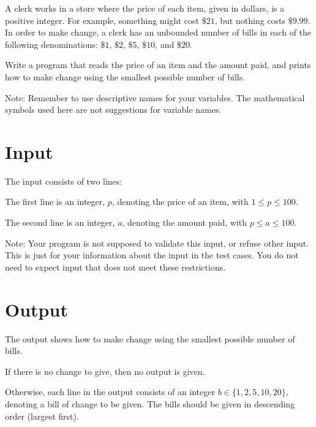 
\noindent
A clerk works in a store where the price of each item, given in dollars, is a positive integer.
For example, something might cost $\$21$, but nothing costs $\$9.99$. 
In order to make change, a clerk has an unbounded number of bills in each of the following denominations:
$\$1$, $\$2$, $\$5$, $\$10$, and $\$20$.

Write a program that reads the price of an item and the amount paid,
and prints how to make change using the smallest possible number of bills.

Note: Remember to use descriptive names for your variables.
The mathematical symbols used here are not suggestions for variable names.

\section*{Input}
The input consists of two lines:

The first line is an integer, $p$, denoting the price of an item, with $1 \leq p \leq 100$.

The second line is an integer, $a$, denoting the amount paid, with $p \leq a \leq 100$.

Note: Your program is not supposed to validate this input, or refuse other input.
This is just for your information about the input in the test cases.
You do not need to expect input that does not meet these restrictions.

\section*{Output}
The output shows how to make change using the smallest possible number of bills.

If there is no change to give, then no output is given.

Otherwise, each line in the output consists of an integer
$b \in \{1, 2, 5, 10, 20\}$,
denoting a bill of change to be given.
The bills should be given in descending order (largest first).
